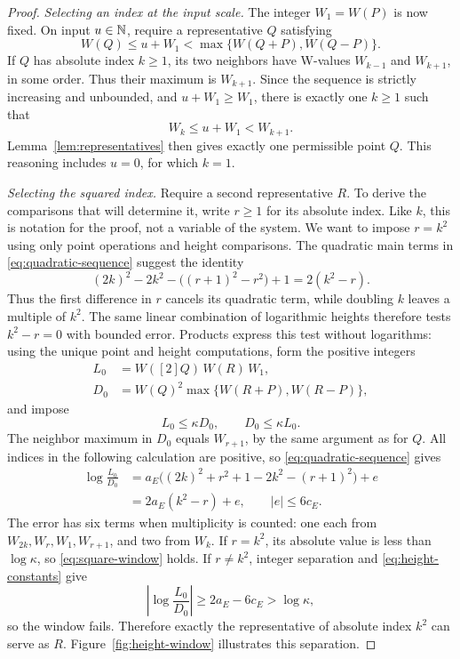 \begin{proof}
\emph{Selecting an index at the input scale.}
The integer \(W_1=W(P)\) is now fixed.  On input \(u\in\mathbb N\),
require a representative \(Q\) satisfying
\begin{equation}\label{eq:index-bracket}
 W(Q)\le u+W_1<
          \max\{W(Q+P),W(Q-P)\}.
\end{equation}
If \(Q\) has absolute index \(k\ge1\), its two neighbors
have W-values \(W_{k-1}\) and \(W_{k+1}\), in some order.
Thus their maximum is \(W_{k+1}\).  Since the sequence is
strictly increasing and unbounded, and \(u+W_1\ge W_1\),
there is exactly one \(k\ge1\) such that
\[
 W_k\le u+W_1<W_{k+1}.
\]
Lemma~\ref{lem:representatives} then gives exactly one permissible
point \(Q\).  This reasoning includes \(u=0\), for which
\(k=1\).

\smallskip
\noindent\emph{Selecting the squared index.}
Require a second representative \(R\). To derive the comparisons that
will determine it, write \(r\ge1\) for its absolute index. Like \(k\),
this is notation for the proof, not a variable of the system. We want
to impose \(r=k^2\) using only point operations and height comparisons.
The quadratic main terms in \eqref{eq:quadratic-sequence} suggest the
identity
\[
 (2k)^2-2k^2-\bigl((r+1)^2-r^2\bigr)+1=2(k^2-r).
\]
Thus the first difference in \(r\) cancels its quadratic term, while
doubling \(k\) leaves a multiple of \(k^2\). The same linear combination
of logarithmic heights therefore tests \(k^2-r=0\) with bounded error.
Products express this test without logarithms: using the
unique point and height computations, form the positive integers
\begin{align*}
 L_0&=W([2]Q)\,W(R)\,W_1,\\
 D_0&=W(Q)^2\max\{W(R+P),W(R-P)\},
\end{align*}
and impose
\begin{equation}\label{eq:square-window}
 L_0\le\kappa D_0,\qquad D_0\le\kappa L_0.
\end{equation}
The neighbor maximum in \(D_0\) equals \(W_{r+1}\), by the same
argument as for \(Q\). All indices in the following calculation are
positive, so
\eqref{eq:quadratic-sequence} gives
\begin{align*}
 \log\frac{L_0}{D_0}
 &=a_E\bigl((2k)^2+r^2+1-2k^2-(r+1)^2\bigr)+e\\
 &=2a_E(k^2-r)+e,\qquad |e|\le6c_E.
\end{align*}
The error has six terms when multiplicity is counted: one each from
\(W_{2k},W_r,W_1,W_{r+1}\), and two from \(W_k\).
If \(r=k^2\), its absolute value is less than \(\log\kappa\),
so \eqref{eq:square-window} holds.  If \(r\ne k^2\), integer
separation and \eqref{eq:height-constants} give
\[
 \left|\log\frac{L_0}{D_0}\right|
     \ge2a_E-6c_E>\log\kappa,
\]
so the window fails.  Therefore exactly the representative of
absolute index \(k^2\) can serve as \(R\).
Figure~\ref{fig:height-window} illustrates this separation.


\end{proof}
